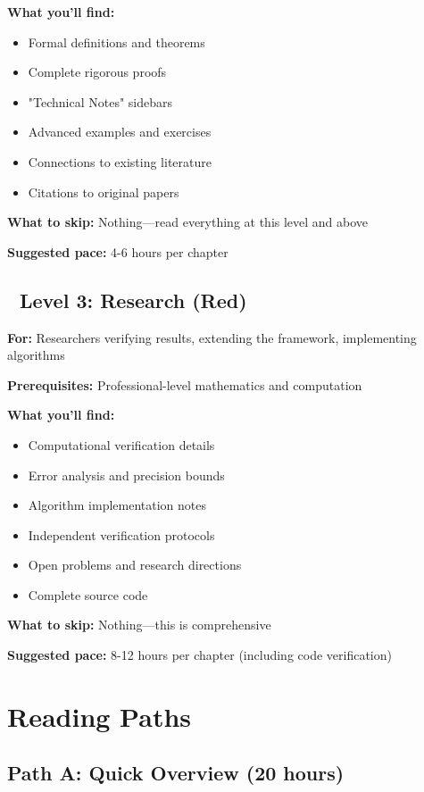 \textbf{What you'll find:}
\begin{itemize}
\item Formal definitions and theorems
\item Complete rigorous proofs
\item "Technical Notes" sidebars
\item Advanced examples and exercises
\item Connections to existing literature
\item Citations to original papers
\end{itemize}

\textbf{What to skip:} Nothing—read everything at this level and above

\textbf{Suggested pace:} 4-6 hours per chapter

\subsection*{🔴 Level 3: Research (Red)}

\textbf{For:} Researchers verifying results, extending the framework, implementing algorithms

\textbf{Prerequisites:} Professional-level mathematics and computation

\textbf{What you'll find:}
\begin{itemize}
\item Computational verification details
\item Error analysis and precision bounds
\item Algorithm implementation notes
\item Independent verification protocols
\item Open problems and research directions
\item Complete source code
\end{itemize}

\textbf{What to skip:} Nothing—this is comprehensive

\textbf{Suggested pace:} 8-12 hours per chapter (including code verification)

\section*{Reading Paths}

\subsection*{Path A: Quick Overview (20 hours)}

